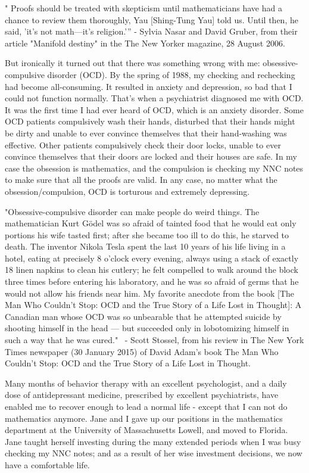 \documentclass[12pt]{article}
\begin{document}
" Proofs should be treated with skepticism until mathematicians have had a chance to review them thoroughly, Yau [Shing-Tung Yau] told us. Until then, he said, 'it’s not math—it’s religion.'”
 - Sylvia Nasar and David Gruber, from their article "Manifold destiny" in the The New Yorker magazine, 28 August 2006.

But ironically it turned out that there was something wrong with me: obsessive-compulsive disorder (OCD). By the spring of 1988, my checking and rechecking had become all-consuming. It resulted in anxiety and depression, so bad that I could not function normally. That's when a psychiatrist diagnosed me with OCD. It was the first time I had ever heard of OCD, which is an anxiety disorder. Some OCD patients compulsively wash their hands, disturbed that their hands might be dirty and unable to ever convince themselves that their hand-washing was effective. Other patients compulsively check their door locks, unable to ever convince themselves that their doors are locked and their houses are safe. In my case the obsession is mathematics, and the compulsion is checking my NNC notes to make sure that all the proofs are valid. In any case, no matter what the obsession/compulsion, OCD is torturous and extremely depressing.

"Obsessive-compulsive disorder can make people do weird things. The mathematician Kurt Gödel was so afraid of tainted food that he would eat only portions his wife tasted first; after she became too ill to do this, he starved to death. The inventor Nikola Tesla spent the last 10 years of his life living in a hotel, eating at precisely 8 o’clock every evening, always using a stack of exactly 18 linen napkins to clean his cutlery; he felt compelled to walk around the block three times before entering his laboratory, and he was so afraid of germs that he would not allow his friends near him. My favorite anecdote from the book [The Man Who Couldn’t Stop: OCD and the True Story of a Life Lost in Thought]: A Canadian man whose OCD was so unbearable that he attempted suicide by shooting himself in the head — but succeeded only in lobotomizing himself in such a way that he was cured."
 - Scott Stossel, from his review in The New York Times newspaper (30 January 2015) of David Adam's book The Man Who Couldn’t Stop: OCD and the True Story of a Life Lost in Thought.


Many months of behavior therapy with an excellent psychologist, and a daily dose of antidepressant medicine, prescribed by excellent psychiatrists, have enabled me to recover enough to lead a normal life - except that I can not do mathematics anymore. Jane and I gave up our positions in the mathematics department at the University of Massachusetts Lowell, and moved to Florida. Jane taught herself investing during the many extended periods when I was busy checking my NNC notes; and as a result of her wise investment decisions, we now have a comfortable life.
\end{document}
